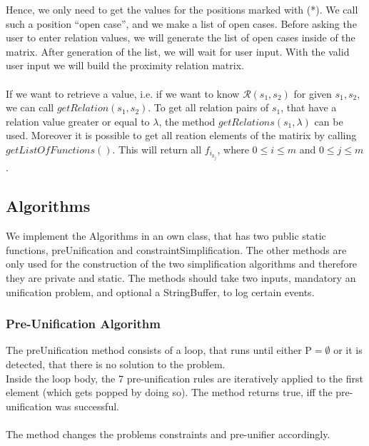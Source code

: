 \documentclass{article}
\begin{document}
Hence, we only need to get the values for the positions marked with (*). We call such a position ``open case'', and we make a list of open cases. Before asking the user to enter relation values, we will generate the list of open cases inside of the matrix. After generation of the list, we will wait for user input. With the valid user input we will build the proximity relation matrix. \\ \ \\
\noindent
If we want to retrieve a value, i.e. if we want to know \(\mathcal{R}(s_1,s_2)\) for given \(s_1,s_2\), we can call \(getRelation(s_1,s_2)\). To get all relation pairs of \(s_1\), that have a relation value greater or equal to \(\lambda\), the method \(getRelations(s_1,\lambda)\) can be used. Moreover it is possible to get all reation elements of the matirix by calling \(getListOf Functions()\). This will return all \( f_{i_{k_j}}\), where \( 0\leq i \leq m\) and \( 0\leq j \leq m\).

\subsection{Algorithms}

We implement the Algorithms in an own class, that has two public  static functions, preUnification and constraintSimplification. The other methods are only used for the construction of the two simplification algorithms and therefore they are private and static. The methods should take two inputs, mandatory an unification problem, and optional a StringBuffer, to log certain events.

\subsubsection{Pre-Unification Algorithm}
The preUnification method consists of a loop, that runs until either \(\mathrm{P}=\emptyset\) or it is detected, that there is no solution to the problem.\\
Inside the loop body, the 7 pre-unification rules are iteratively applied to the first element (which gets popped by doing so). The method returns true, iff the pre-unification was successful.
\\ \ \\
\noindent 
The method changes the problems constraints and pre-unifier accordingly.
	
\end{document}
